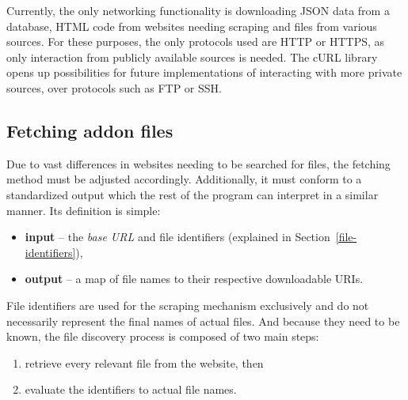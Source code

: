 Currently, the only networking functionality is downloading JSON data from a database, HTML code from websites needing scraping and files from various sources.
For these purposes, the only protocols used are HTTP or HTTPS, as only interaction from publicly available sources is needed.
The cURL library opens up possibilities for future implementations of interacting with more private sources, over protocols such as FTP or SSH.

\subsection{Fetching addon files}
\label{fetching-files}

Due to vast differences in websites needing to be searched for files, the fetching method must be adjusted accordingly.
Additionally, it must conform to a standardized output which the rest of the program can interpret in a similar manner.
Its definition is simple:
\begin{itemize}
\item \textbf{input} -- the \textit{base URL} and file identifiers (explained in Section~\ref{file-identifiers}),
\item \textbf{output} -- a map of file names to their respective downloadable URIs.
\end{itemize}

File identifiers are used for the scraping mechanism exclusively and do not necessarily represent the final names of actual files.
And because they need to be known, the file discovery process is composed of two main steps:
\begin{enumerate}
\item retrieve every relevant file from the website, then
\item evaluate the identifiers to actual file names.
\end{enumerate}

